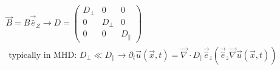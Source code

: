 \begin{equation}
    \begin{gathered}
        \vec{B}=B \vec{\hat{e}}_Z \rightarrow D=\left(\begin{array}{ccc}
            D_{\perp} & 0 & 0 \\
            0 & D_{\perp} & 0 \\
            0 & 0 & D_{\|}
            \end{array}\right) \\
            \text { typically in MHD: } D_{\perp} \ll D_{\|} \rightarrow \partial_t \vec{u}(\vec{x}, t)=\vec{\nabla} \cdot D_{\|} \vec{\hat{e}}_z\left(\vec{\hat{e}}_z \vec{\nabla} \vec{u}(\vec{x}, t)\right)
    \end{gathered}
\end{equation}

\pagebreak